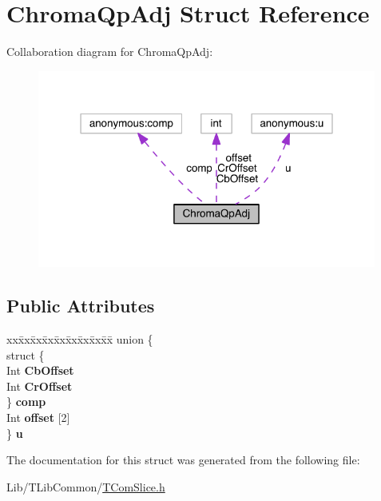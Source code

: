 \hypertarget{struct_chroma_qp_adj}{}\section{Chroma\+Qp\+Adj Struct Reference}
\label{struct_chroma_qp_adj}


Collaboration diagram for Chroma\+Qp\+Adj\+:
\nopagebreak
\begin{figure}[H]
\begin{center}
\leavevmode
\includegraphics[width=316pt]{d4/d0e/struct_chroma_qp_adj__coll__graph}
\end{center}
\end{figure}
\subsection*{Public Attributes}
\begin{DoxyCompactItemize}
\item 
\mbox{\label{struct_chroma_qp_adj_a6753b8c24e00c7dde7b30b6ca9f4b303}} 
\begin{tabbing}
xx\=xx\=xx\=xx\=xx\=xx\=xx\=xx\=xx\=\kill
union \{\\
\>struct \{\\
\>\>Int {\bfseries CbOffset}\\
\>\>Int {\bfseries CrOffset}\\
\>\} {\bfseries comp}\\
\>Int {\bfseries offset} \mbox{[}2\mbox{]}\\
\} {\bfseries u}\\

\end{tabbing}\end{DoxyCompactItemize}


The documentation for this struct was generated from the following file\+:\begin{DoxyCompactItemize}
\item 
Lib/\+T\+Lib\+Common/\hyperlink{_t_com_slice_8h}{T\+Com\+Slice.\+h}\end{DoxyCompactItemize}
